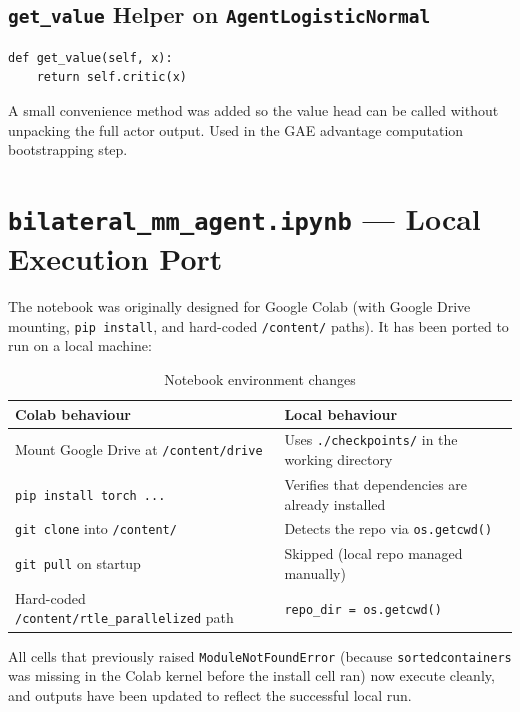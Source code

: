\documentclass[11pt,a4paper]{article}
\begin{document}
\subsection{\texttt{get\_value} Helper on \texttt{AgentLogisticNormal}}

\begin{lstlisting}
def get_value(self, x):
    return self.critic(x)
\end{lstlisting}

A small convenience method was added so the value head can be called
without unpacking the full actor output.  Used in the GAE advantage
computation bootstrapping step.

\section{\texttt{bilateral\_mm\_agent.ipynb} — Local Execution Port}

The notebook was originally designed for Google Colab (with Google Drive
mounting, \texttt{pip install}, and hard-coded \texttt{/content/} paths).
It has been ported to run on a local machine:

\begin{table}[h!]
\centering
\renewcommand{\arraystretch}{1.3}
\begin{tabularx}{\linewidth}{lX}
\toprule
\textbf{Colab behaviour} & \textbf{Local behaviour} \\
\midrule
Mount Google Drive at \texttt{/content/drive} & Uses \texttt{./checkpoints/} in the working directory \\
\texttt{pip install torch ...} & Verifies that dependencies are already installed \\
\texttt{git clone} into \texttt{/content/} & Detects the repo via \texttt{os.getcwd()} \\
\texttt{git pull} on startup & Skipped (local repo managed manually) \\
Hard-coded \texttt{/content/rtle\_parallelized} path & \texttt{repo\_dir = os.getcwd()} \\
\bottomrule
\end{tabularx}
\caption{Notebook environment changes}
\end{table}

All cells that previously raised \texttt{ModuleNotFoundError} (because
\texttt{sortedcontainers} was missing in the Colab kernel before the
install cell ran) now execute cleanly, and outputs have been updated to
reflect the successful local run.
\end{document}
